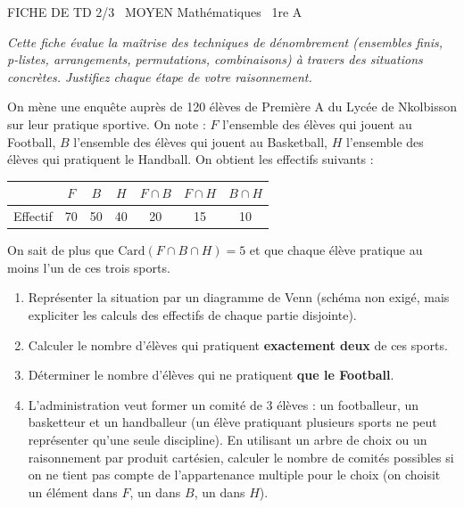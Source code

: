 \documentclass[11pt]{article}
\begin{document}
\begin{tcolorbox}[enhanced,colback=popink,colframe=popink,arc=10pt,boxrule=0pt,left=12pt,right=12pt,top=9pt,bottom=9pt]
{\color{white}\popxbold\small FICHE DE TD 2/3 \textbullet\ MOYEN \hfill Mathématiques \textbullet\ 1re A\par}
\end{tcolorbox}
\vspace{4pt}
\emph{Cette fiche évalue la maîtrise des techniques de dénombrement (ensembles finis, p-listes, arrangements, permutations, combinaisons) à travers des situations concrètes. Justifiez chaque étape de votre raisonnement.}

\begin{exercice}
On mène une enquête auprès de \num{120} élèves de Première A du Lycée de Nkolbisson sur leur pratique sportive. On note :
$F$ l'ensemble des élèves qui jouent au Football,
$B$ l'ensemble des élèves qui jouent au Basketball,
$H$ l'ensemble des élèves qui pratiquent le Handball.
On obtient les effectifs suivants :
\begin{center}
\begin{tabular}{|c|c|c|c|c|c|c|}
\hline
& $F$ & $B$ & $H$ & $F \cap B$ & $F \cap H$ & $B \cap H$ \\ \hline
Effectif & 70 & 50 & 40 & 20 & 15 & 10 \\ \hline
\end{tabular}
\end{center}
On sait de plus que $\text{Card}(F \cap B \cap H) = 5$ et que chaque élève pratique au moins l'un de ces trois sports.
\begin{enumerate}
    \item Représenter la situation par un diagramme de Venn (schéma non exigé, mais expliciter les calculs des effectifs de chaque partie disjointe).
    \item Calculer le nombre d'élèves qui pratiquent \textbf{exactement deux} de ces sports.
    \item Déterminer le nombre d'élèves qui ne pratiquent \textbf{que le Football}.
    \item L'administration veut former un comité de 3 élèves : un footballeur, un basketteur et un handballeur (un élève pratiquant plusieurs sports ne peut représenter qu'une seule discipline). En utilisant un arbre de choix ou un raisonnement par produit cartésien, calculer le nombre de comités possibles si on ne tient pas compte de l'appartenance multiple pour le choix (on choisit un élément dans $F$, un dans $B$, un dans $H$).
\end{enumerate}
\end{exercice}
\end{document}
